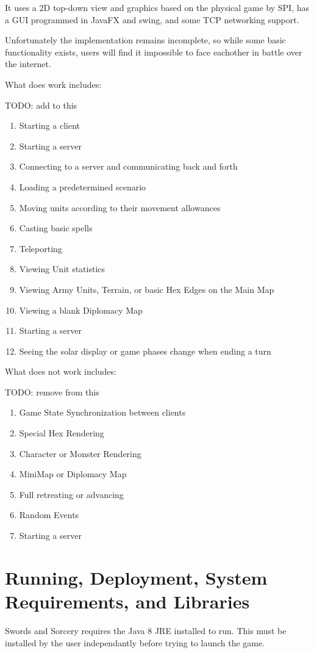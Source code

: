 \documentclass[12pt,a4paper]{article}
\begin{document}
It uses a 2D top-down view and graphics based on the physical game by SPI,
has a GUI programmed in JavaFX and swing, and some TCP networking
support.

Unfortunately the implementation remains incomplete, so while some basic
functionality exists, users will find it impossible to face eachother in battle
over the internet.

What does work includes:

TODO: add to this
\begin{enumerate}
\item{Starting a client}
\item{Starting a server}
\item{Connecting to a server and communicating back and forth}
\item{Loading a predetermined scenario}
\item{Moving units according to their movement allowances}
\item{Casting basic spells}
\item{Teleporting}
\item{Viewing Unit statistics}
\item{Viewing Army Units, Terrain, or basic Hex Edges on the Main Map}
\item{Viewing a blank Diplomacy Map}
\item{Starting a server}
\item{Seeing the solar display or game phases change when ending a turn}
\end{enumerate}

What does not work includes:

TODO: remove from this
\begin{enumerate}
\item{Game State Synchronization between clients}
\item{Special Hex Rendering}
\item{Character or Monster Rendering}
\item{MiniMap or Diplomacy Map}
\item{Full retreating or advancing}
\item{Random Events}
\item{Starting a server}
\end{enumerate}

\section{Running, Deployment, System Requirements, and Libraries}
Swords and Sorcery requires the Java 8 JRE installed to run. This must be 
installed by the user independantly before trying to launch the game.
\end{document}
